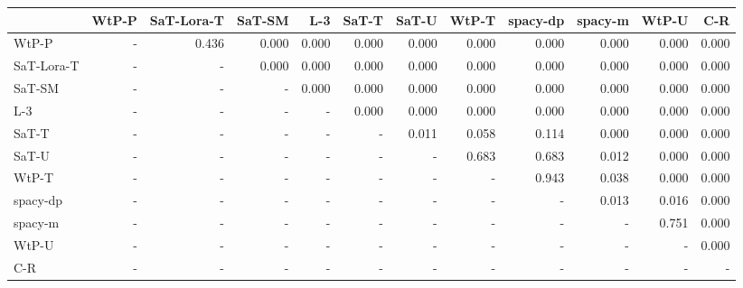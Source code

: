 \begin{tabular}{lrrrrrrrrrrr}
\toprule
 & WtP-P & SaT-Lora-T & SaT-SM & L-3 & SaT-T & SaT-U & WtP-T & spacy-dp & spacy-m & WtP-U & C-R \\
\midrule
WtP-P & - & 0.436 & 0.000 & 0.000 & 0.000 & 0.000 & 0.000 & 0.000 & 0.000 & 0.000 & 0.000 \\
SaT-Lora-T & - & - & 0.000 & 0.000 & 0.000 & 0.000 & 0.000 & 0.000 & 0.000 & 0.000 & 0.000 \\
SaT-SM & - & - & - & 0.000 & 0.000 & 0.000 & 0.000 & 0.000 & 0.000 & 0.000 & 0.000 \\
L-3 & - & - & - & - & 0.000 & 0.000 & 0.000 & 0.000 & 0.000 & 0.000 & 0.000 \\
SaT-T & - & - & - & - & - & 0.011 & 0.058 & 0.114 & 0.000 & 0.000 & 0.000 \\
SaT-U & - & - & - & - & - & - & 0.683 & 0.683 & 0.012 & 0.000 & 0.000 \\
WtP-T & - & - & - & - & - & - & - & 0.943 & 0.038 & 0.000 & 0.000 \\
spacy-dp & - & - & - & - & - & - & - & - & 0.013 & 0.016 & 0.000 \\
spacy-m & - & - & - & - & - & - & - & - & - & 0.751 & 0.000 \\
WtP-U & - & - & - & - & - & - & - & - & - & - & 0.000 \\
C-R & - & - & - & - & - & - & - & - & - & - & - \\
\bottomrule
\end{tabular}

